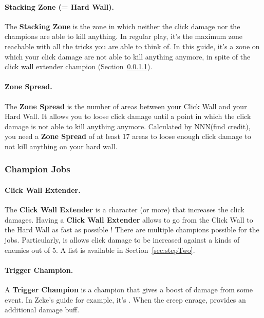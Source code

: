 \documentclass{article}
\begin{document}
\paragraph{Stacking Zone (= Hard Wall).}

The \textbf{Stacking Zone} is the zone in which neither the click damage nor the champions are able to kill anything.
In regular play, it's the maximum zone reachable with all the tricks you are able to think of.
In this guide, it's a zone on which your click damage are not able to kill anything anymore, in spite of the click wall extender champion (Section~\ref{sec:clickWallExtender}).

\paragraph{Zone Spread.}

The \textbf{Zone Spread} is the number of areas between your Click Wall and your Hard Wall.
It allows you to loose click damage until a point in which the click damage is not able to kill anything anymore.
Calculated by NNN(find credit), you need a \textbf{Zone Spread} of at least 17 areas to loose enough click damage to not kill anything on your hard wall.

\subsubsection{Champion Jobs}

\paragraph{Click Wall Extender.}
\label{sec:clickWallExtender}

The \textbf{Click Wall Extender} is a character (or more) that increases the click damages.
Having a \textbf{Click Wall Extender} allows to go from the Click Wall to the Hard Wall as fast as possible !
There are multiple champions possible for the jobs.
Particularly, \minsc is allows click damage to be increased against a kinds of enemies out of 5.
A list is available in Section~\ref{sec:stepTwo}.

\paragraph{Trigger Champion.}

A \textbf{Trigger Champion} is a champion that gives a boost of damage from some event.
In Zeke's guide for example, it's \dragonbait.
When the creep enrage, \dragonbait provides an additional damage buff.
\end{document}
